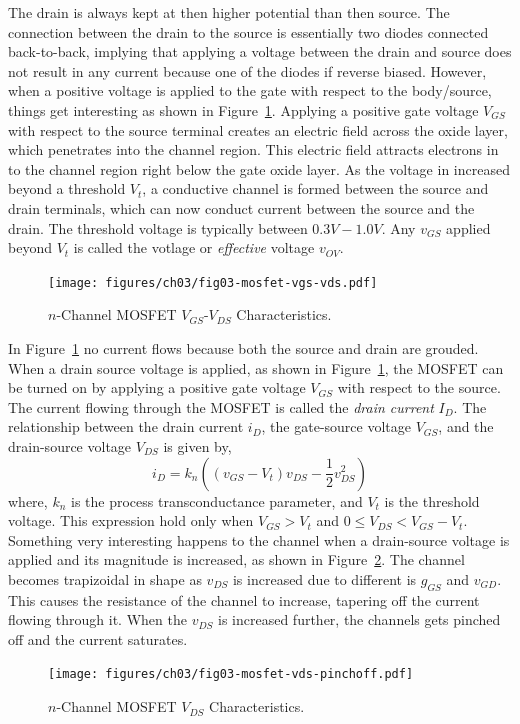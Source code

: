 The drain is always kept at then higher potential than then source. The connection between the drain to the source is essentially two diodes connected back-to-back, implying that applying a voltage between the drain and source does not result in any current because one of the diodes if reverse biased. However, when a positive voltage is applied to the gate with respect to the body/source, things get interesting as shown in Figure~\ref{fig:03-mosfet-gate-volt}. Applying a positive gate voltage $V_{GS}$ with respect to the source terminal creates an electric field across the oxide layer, which penetrates into the channel region. This electric field attracts electrons in to the channel region right below the gate oxide layer. As the voltage in increased beyond a threshold $V_t$, a conductive channel is formed between the source and drain terminals, which can now conduct current between the source and the drain. The threshold voltage is typically between $0.3V-1.0V$. Any $v_{GS}$ applied beyond $V_t$ is called the  votlage or \textit{effective} voltage $v_{OV}$.

\begin{figure}[t]
    \centering
    \texttt{[image: figures/ch03/fig03-mosfet-vgs-vds.pdf]}
    \caption{$n$-Channel MOSFET $V_{GS}$-$V_{DS}$ Characteristics.}
    \label{fig:03-mosfet-gate-volt}
\end{figure}

In Figure~\ref{fig:03-mosfet-gate-volt} no current flows because both the source and drain are grouded. When a drain source voltage is applied, as shown in Figure~\ref{fig:03-mosfet-gate-volt}, the MOSFET can be turned on by applying a positive gate voltage $V_{GS}$ with respect to the source. The current flowing through the MOSFET is called the \textit{drain current} $I_D$. The relationship between the drain current $i_D$, the gate-source voltage $V_{GS}$, and the drain-source voltage $V_{DS}$ is given by,
\begin{equation}
    i_D = k_n\left(\left(v_{GS} - V_t\right)v_{DS} - \frac{1}{2}v_{DS}^2\right)
    \label{eq03-mosfet-id-vgs}
\end{equation}
where, $k_n$ is the process transconductance parameter, and $V_t$ is the threshold voltage. This expression hold only when $V_{GS} > V_t$ and $0 \leq V_{DS} < V_{GS} - V_t$. Something very interesting happens to the channel when a drain-source voltage is applied and its magnitude is increased, as shown in Figure~\ref{fig:03-mosfet-vds-pinchoff}. The channel becomes trapizoidal in shape as $v_{DS}$ is increased due to different is $g_{GS}$ and $v_{GD}$. This causes the resistance of the channel to increase, tapering off the current flowing through it. When the $v_{DS}$ is increased further, the channels gets pinched off and the current saturates.
\begin{figure}[b]
    \centering
    \texttt{[image: figures/ch03/fig03-mosfet-vds-pinchoff.pdf]}
    \caption{$n$-Channel MOSFET $V_{DS}$ Characteristics.}
    \label{fig:03-mosfet-vds-pinchoff}
\end{figure}

